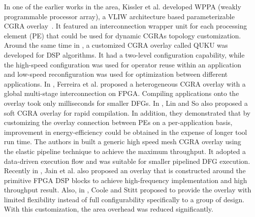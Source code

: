 In one of the earlier works in the area, Kissler et al. developed WPPA (weakly programmable processor array), a VLIW architecture based parameterizable CGRA overlay~\cite{kissler2006dynamically}. It featured an interconnection wrapper unit for each processing element (PE) that could be used for dynamic CGRAs topology customization. 
Around the same time in \cite{shukla2006quku}, a customized CGRA overlay called QUKU was developed for DSP algorithms. It had a two-level configuration capability, while the high-speed configuration was used for operator reuse within an application and low-speed reconfiguration was used for optimization between different applications. 
In \cite{ferreira2011fpga}, Ferreira et al. proposed a heterogeneous CGRA overlay with a global multi-stage interconnection on FPGA. Compiling applications onto the overlay took only milliseconds for smaller DFGs. 
In \cite{Lin:2012:EDC:2460216.2460227}, Lin and So also proposed a soft CGRA overlay for rapid compilation.  In addition, they demonstrated that by customizing the overlay connection between PEs on a per-application basis, improvement in energy-efficiency could be obtained in the expense of longer tool run time.
The authors in \cite{capalijia2013pipelined} built a generic high speed mesh CGRA overlay using the elastic pipeline technique to achieve the maximum throughput. It adopted a data-driven execution flow and was suitable for smaller pipelined DFG execution.
Recently in \cite{dspoverlay}, Jain et al. also proposed an overlay that is constructed around the primitive FPGA DSP blocks to achieve high-frequency implementation and high throughput result.
Also, in \cite{adjustable2015}, Coole and Stitt proposed to provide the overlay with limited flexibility instead of full configurability specifically to a group of design. With this customization, the area overhead was reduced significantly.




